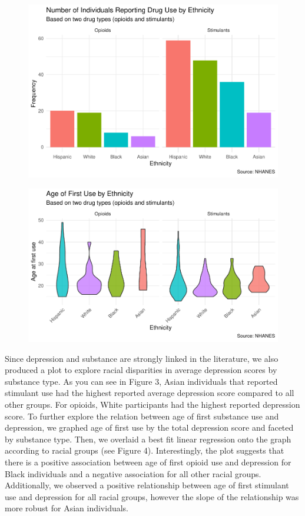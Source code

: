 \documentclass[man]{apa6}
\begin{document}
\begin{figure}
\centering
\includegraphics{Final_Paper_Group_3_files/figure-latex/ST_fig1-1.pdf}
\caption{}
\end{figure}

\begin{figure}
\centering
\includegraphics{Final_Paper_Group_3_files/figure-latex/ST_fig2-1.pdf}
\caption{}
\end{figure}

Since depression and substance are strongly linked in the literature, we
also produced a plot to explore racial disparities in average depression
scores by substance type. As you can see in Figure 3, Asian individuals
that reported stimulant use had the highest reported average depression
score compared to all other groups. For opioids, White participants had
the highest reported depression score. To further explore the relation
between age of first substance use and depression, we graphed age of
first use by the total depression score and faceted by substance type.
Then, we overlaid a best fit linear regression onto the graph according
to racial groups (see Figure 4). Interestingly, the plot suggests that
there is a positive association between age of first opioid use and
depression for Black individuals and a negative association for all
other racial groups. Additionally, we observed a positive relationship
between age of first stimulant use and depression for all racial groups,
however the slope of the relationship was more robust for Asian
individuals.
\end{document}
